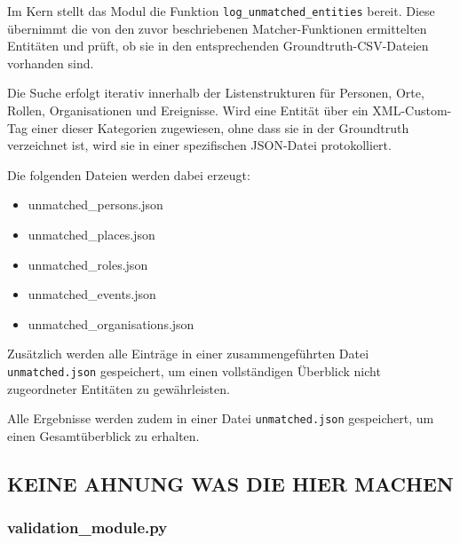 \documentclass[12pt, a4paper, ngerman, bidi=default]{article}
\newcommand{\code}[1]{\colorbox{VeryLightGray}{\texttt{#1}}} %
\begin{document}
\begin{minipage}[t]{0.4\textwidth}
{} %
  \label{fig:unmatched_logger.py}
\end{minipage}


Im Kern stellt das Modul die Funktion \texttt{log\_unmatched\_entities} bereit. 
Diese übernimmt die von den zuvor beschriebenen Matcher-Funktionen ermittelten Entitäten 
und prüft, ob sie in den entsprechenden Groundtruth-CSV-Dateien vorhanden sind. 

Die Suche erfolgt iterativ innerhalb der Listenstrukturen für Personen, Orte, Rollen, Organisationen und Ereignisse. 
Wird eine Entität über ein XML-Custom-Tag einer dieser Kategorien zugewiesen, ohne dass sie in der Groundtruth verzeichnet ist, 
wird sie in einer spezifischen JSON-Datei protokolliert.

Die folgenden Dateien werden dabei erzeugt:
\begin{itemize}
  \item unmatched\_persons.json
  \item unmatched\_places.json
  \item unmatched\_roles.json
  \item unmatched\_events.json
  \item unmatched\_organisations.json
\end{itemize}

Zusätzlich werden alle Einträge in einer zusammengeführten Datei \texttt{unmatched.json} gespeichert, 
um einen vollständigen Überblick nicht zugeordneter Entitäten zu gewährleisten.


Alle Ergebnisse werden zudem in einer Datei \code{unmatched.json} gespeichert, um einen Gesamtüberblick zu erhalten.



\subsection{KEINE AHNUNG WAS DIE HIER MACHEN}
\subsubsection{validation\_module.py}
\end{document}
